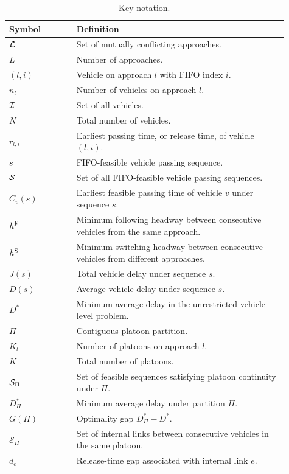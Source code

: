\begin{table}[t]
\centering
\caption{Key notation.}
\label{tab:notation}
\begin{tabular}{p{0.22\linewidth}p{0.69\linewidth}}
\toprule
Symbol & Definition \\
\midrule
\(\mathcal{L}\) & Set of mutually conflicting approaches. \\
\(L\) & Number of approaches. \\
\((l,i)\) & Vehicle on approach \(l\) with FIFO index \(i\). \\
\(n_l\) & Number of vehicles on approach \(l\). \\
\(\mathcal{I}\) & Set of all vehicles. \\
\(N\) & Total number of vehicles. \\
\(r_{l,i}\) & Earliest passing time, or release time, of vehicle \((l,i)\). \\
\(s\) & FIFO-feasible vehicle passing sequence. \\
\(\mathcal{S}\) & Set of all FIFO-feasible vehicle passing sequences. \\
\(C_v(s)\) & Earliest feasible passing time of vehicle \(v\) under sequence \(s\). \\
\(h^{\mathrm{F}}\) & Minimum following headway between consecutive vehicles from the same approach. \\
\(h^{\mathrm{S}}\) & Minimum switching headway between consecutive vehicles from different approaches. \\
\(J(s)\) & Total vehicle delay under sequence \(s\). \\
\(D(s)\) & Average vehicle delay under sequence \(s\). \\
\(D^*\) & Minimum average delay in the unrestricted vehicle-level problem. \\
\(\Pi\) & Contiguous platoon partition. \\
\(K_l\) & Number of platoons on approach \(l\). \\
\(K\) & Total number of platoons. \\
\(\mathcal{S}_{\Pi}\) & Set of feasible sequences satisfying platoon continuity under \(\Pi\). \\
\(D^*_{\Pi}\) & Minimum average delay under partition \(\Pi\). \\
\(G(\Pi)\) & Optimality gap \(D^*_{\Pi}-D^*\). \\
\(\mathcal{E}_{\Pi}\) & Set of internal links between consecutive vehicles in the same platoon. \\
\(d_e\) & Release-time gap associated with internal link \(e\). \\
\bottomrule
\end{tabular}
\end{table}
